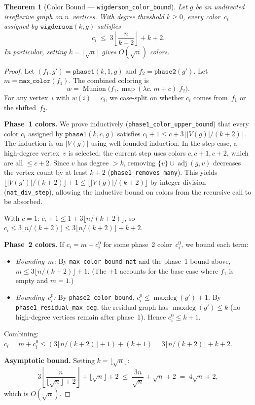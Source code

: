 \documentclass[11pt]{article}
\theoremstyle{plain}
\newtheorem{theorem}{Theorem}[section]
\theoremstyle{definition}
\theoremstyle{remark}
\newcommand{\adj}{\operatorname{adj}}
\newcommand{\Munion}{\operatorname{Munion}}
\newcommand{\maxdeg}{\operatorname{maxdeg}}
\begin{document}
\begin{theorem}[Color Bound --- \texttt{wigderson\_color\_bound}]
\label{thm:color-bound}
Let $g$ be an undirected irreflexive graph on $n$~vertices.
With degree threshold $k \ge 0$, every color~$c_i$ assigned by
$\texttt{wigderson}(k, g)$ satisfies
\[
  c_i \;\le\; 3\!\left\lfloor \frac{n}{k+2} \right\rfloor + k + 2.
\]
In particular, setting $k = \lfloor\!\sqrt{n}\rfloor$ gives
$O(\!\sqrt{n})$ colors.
\end{theorem}

\begin{proof}
Let $(f_1, g') = \texttt{phase1}(k, 1, g)$ and $f_2 = \texttt{phase2}(g')$.
Let $m = \texttt{max\_color}(f_1)$.
The combined coloring is
\[
  w = \Munion\!\bigl(f_1,\; \text{map}\;(\lambda c.\; m + c)\; f_2\bigr).
\]
For any vertex~$i$ with $w(i) = c_i$, we case-split on whether $c_i$ comes from~$f_1$ or the shifted~$f_2$.

\medskip\noindent
\textbf{Phase~1 colors.}
We prove inductively (\texttt{phase1\_color\_upper\_bound}) that every color $c_i$ assigned by $\texttt{phase1}(k, c, g)$ satisfies
$c_i + 1 \le c + 3\lfloor |V(g)|/(k{+}2) \rfloor$.
The induction is on $|V(g)|$ using well-founded induction.
In the step case, a high-degree vertex~$v$ is selected; the current step uses colors $c, c{+}1, c{+}2$, which are all $\le c + 2$.
Since $v$ has degree $> k$, removing $\{v\} \cup \adj(g,v)$ decreases the vertex count by at least $k{+}2$ (\texttt{phase1\_removes\_many}).
This yields $\lfloor |V(g')|/(k{+}2)\rfloor + 1 \le \lfloor |V(g)|/(k{+}2)\rfloor$ by integer division (\texttt{nat\_div\_step}),
allowing the inductive bound on colors from the recursive call to be absorbed.

With $c = 1$: $c_i + 1 \le 1 + 3\lfloor n/(k{+}2)\rfloor$, so $c_i \le 3\lfloor n/(k{+}2)\rfloor \le 3\lfloor n/(k{+}2)\rfloor + k + 2$.

\medskip\noindent
\textbf{Phase~2 colors.}
If $c_i = m + c_i^0$ for some phase~2 color~$c_i^0$, we bound each term:
\begin{itemize}[nosep]
  \item \emph{Bounding~$m$:}
  By \texttt{max\_color\_bound\_nat} and the phase~1 bound above,
  $m \le 3\lfloor n/(k{+}2)\rfloor + 1$.
  (The $+1$ accounts for the base case where $f_1$ is empty and $m = 1$.)
  \item \emph{Bounding~$c_i^0$:}
  By \texttt{phase2\_color\_bound}, $c_i^0 \le \maxdeg(g') + 1$.
  By \texttt{phase1\_residual\_max\_deg}, the residual graph has $\maxdeg(g') \le k$
  (no high-degree vertices remain after phase~1).
  Hence $c_i^0 \le k + 1$.
\end{itemize}
Combining: $c_i = m + c_i^0 \le (3\lfloor n/(k{+}2)\rfloor + 1) + (k + 1) = 3\lfloor n/(k{+}2)\rfloor + k + 2$.

\medskip\noindent
\textbf{Asymptotic bound.}
Setting $k = \lfloor\!\sqrt{n}\rfloor$:
\[
  3\!\left\lfloor \frac{n}{\lfloor\!\sqrt{n}\rfloor + 2} \right\rfloor
  + \lfloor\!\sqrt{n}\rfloor + 2
  \;\le\;
  \frac{3n}{\sqrt{n}}
  + \sqrt{n} + 2
  \;=\;
  4\sqrt{n} + 2,
\]
which is $O(\!\sqrt{n})$.
\end{proof}
\end{document}
